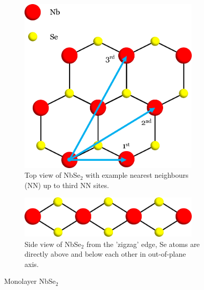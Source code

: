 \documentclass[10pt, twocolumn]{article} %
\begin{document}
\begin{figure}[t]
\centering
  \begin{subfigure}[t]{0.45\textwidth}
    \centering
    \includegraphics[width=0.95\textwidth]{NbSe_top.png}
    \caption{
      Top view of NbSe$_2$ with example nearest neighbours (NN) up to third NN sites.
    }
  \end{subfigure}
  \hfill
  \begin{subfigure}[t]{0.45\textwidth}
    \centering
    \includegraphics[width=0.95\textwidth]{NbSe_side.png}
    \caption{
      Side view of NbSe$_2$ from the 'zigzag' edge, Se atoms are directly above and below each other in out-of-plane axis.
    }
  \end{subfigure}
  \caption{
    Monolayer NbSe$_2$
  }
\end{figure}
\end{document}
